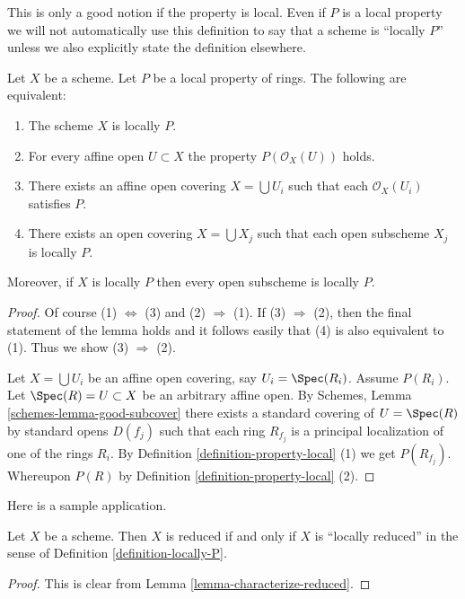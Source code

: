 \noindent
This is only a good notion if the property is local.
Even if $P$ is a local property we will not
automatically use this definition to say that a scheme is
``locally $P$'' unless we also explicitly state the definition
elsewhere.

\begin{lemma}
\label{lemma-locally-P}
Let $X$ be a scheme. Let $P$ be a local property of rings.
The following are equivalent:
\begin{enumerate}
\item The scheme $X$ is locally $P$.
\item For every affine open $U \subset X$ the property
$P(\mathcal{O}_X(U))$ holds.
\item There exists an affine open covering $X = \bigcup U_i$ such that
each $\mathcal{O}_X(U_i)$ satisfies $P$.
\item There exists an open covering $X = \bigcup X_j$
such that each open subscheme $X_j$ is locally $P$.
\end{enumerate}
Moreover, if $X$ is locally $P$ then every open subscheme
is locally $P$.
\end{lemma}

\begin{proof}
Of course (1) $\Leftrightarrow$ (3) and (2) $\Rightarrow$ (1).
If (3) $\Rightarrow$ (2), then the final statement of the lemma
holds and it follows easily that (4) is also equivalent to (1).
Thus we show (3) $\Rightarrow$ (2).

\medskip\noindent
Let $X = \bigcup U_i$ be an affine open covering, say
$U_i = \Spec(R_i)$. Assume $P(R_i)$.
Let $\Spec(R) = U \subset X$ be an arbitrary affine open.
By Schemes, Lemma \ref{schemes-lemma-good-subcover}
there exists a standard covering of $U = \Spec(R)$ by
standard opens $D(f_j)$ such that each ring $R_{f_j}$ is a
principal localization of one of the rings $R_i$. By
Definition \ref{definition-property-local} (1) we get $P(R_{f_j})$.
Whereupon $P(R)$ by Definition \ref{definition-property-local} (2).
\end{proof}

\noindent
Here is a sample application.

\begin{lemma}
\label{lemma-reduced-is-locally-reduced}
Let $X$ be a scheme. Then $X$ is reduced if and only if $X$ is
``locally reduced'' in the sense of Definition \ref{definition-locally-P}.
\end{lemma}

\begin{proof}
This is clear from Lemma \ref{lemma-characterize-reduced}.
\end{proof}

